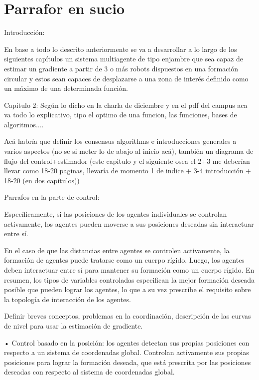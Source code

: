 \newpage
\thispagestyle{empty}
\mbox{}

\chapter{Parrafor en sucio}
\label{ch:chapter6}

Introducción:

En base a todo lo descrito anteriormente se va a desarrollar a lo largo de los siguientes capítulos un  sistema multiagente de tipo enjambre que sea capaz de estimar un gradiente a partir de 3 o más robots dispuestos en una formación circular y estos sean capaces de desplazarse a una zona de interés definido como un máximo de una determinada función.


Capitulo 2: Según lo dicho en la charla de diciembre y en el pdf del campus aca va todo lo explicativo, tipo el optimo de una funcion, las funciones, bases de algoritmos....

Acá habría que definir los consensus algorithms e introducciones generales a varios aspectos (no se si meter lo de abajo al inicio acá), también un diagrama de flujo del control+estimador (este capitulo y el siguiente osea el 2+3 me deberían llevar como 18-20 paginas, llevaría de momento 1 de indice + 3-4 introducción + 18-20 (en dos capítulos))


Parrafos en la parte de control:

Específicamente, si las posiciones de los agentes individuales se controlan activamente, los agentes pueden moverse a sus posiciones deseadas sin interactuar entre sí. 
 
En el caso de que las distancias entre agentes se controlen activamente, la formación de agentes puede tratarse como un cuerpo rígido. Luego, los agentes deben interactuar entre sí para mantener su formación como un cuerpo rígido. En resumen, los tipos de variables controladas especifican la mejor formación deseada posible que pueden lograr los agentes, lo que a su vez prescribe el requisito sobre la topología de interacción de los agentes.

Definir breves conceptos, problemas en la coordinación, descripción de las curvas de nivel para usar la estimación de gradiente.


• Control basado en la posición: los agentes detectan sus propias posiciones con respecto a un sistema de coordenadas global. Controlan activamente sus propias posiciones para lograr la formación deseada, que está prescrita por las posiciones deseadas con respecto al sistema de coordenadas global.

